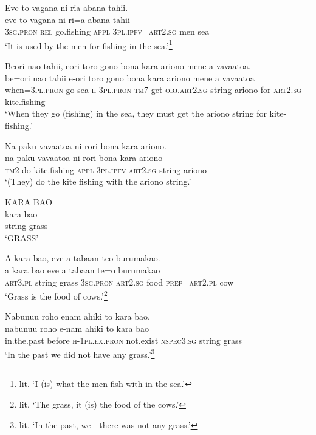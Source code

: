\ea\label{ex:text7-7}
Eve to vagana ni ria abana tahii.\\
\gll eve	to	vagana	ni	ri=a	abana	tahii\\
     3\textsc{sg}.\textsc{pron}	\textsc{rel}	go.fishing	\textsc{appl}	3\textsc{pl}.\textsc{ipfv}=\textsc{art}2.\textsc{sg}	men	sea\\
\glt `It is used by the men for fishing in the sea.'\footnote{lit. `I (is) what the men fish with in the sea.'}
\z

\ea\label{ex:text7-8}
Beori nao tahii, eori toro gono bona kara ariono mene a vavaatoa.\\
\gll be=ori	nao	tahii	e-ori	toro	gono	bona	kara	ariono	mene	a	vavaatoa\\
     when=3\textsc{pl}.\textsc{pron}	go	sea	\textsc{h}-3\textsc{pl}.\textsc{pron}	\textsc{tm}7	get	\textsc{obj}.\textsc{art}2.\textsc{sg}	string	ariono	for	\textsc{art}2.\textsc{sg}	kite.fishing\\
\glt `When they go (fishing) in the sea, they must get the ariono string for kite-fishing.'
\z

\ea\label{ex:text7-9}
Na paku vavaatoa ni rori bona kara ariono.\\
\gll na	paku	vavaatoa	ni	rori	bona	kara	ariono\\
     \textsc{tm}2	do	kite.fishing	\textsc{appl}	3\textsc{pl}.\textsc{ipfv}	\textsc{art}2.\textsc{sg}	string	ariono\\
\glt `(They) do the kite fishing with the ariono string.'
\z

\ea\label{ex:text7-10}
KARA BAO\\
\gll kara	bao\\
     string	grass\\
\glt `GRASS'
\z

\ea\label{ex:text7-11}
A kara bao, eve a tabaan teo burumakao.\\
\gll a	kara	bao	eve	a	tabaan	te=o	burumakao\\
     \textsc{art}3.\textsc{pl}	string	grass	3\textsc{sg}.\textsc{pron}	\textsc{art}2.\textsc{sg}	food	\textsc{prep}=\textsc{art}2.\textsc{pl}	cow\\
\glt `Grass is the food of cows.'\footnote{lit. `The grass, it (is) the food of the cows.'}
\z

\ea\label{ex:text7-12}
Nabunuu roho enam ahiki to kara bao.\\
\gll nabunuu	roho	e-nam	ahiki	to	kara	bao\\
     in.the.past	before	\textsc{h}-1\textsc{pl}.\textsc{ex}.\textsc{pron}	not.exist	\textsc{nspec}3.\textsc{sg}	string	grass\\
\glt `In the past we did not have any grass.'\footnote{lit. `In the past, we - there was not any grass.'}
\z

